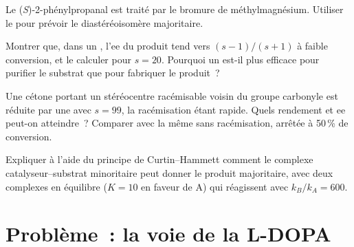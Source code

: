\begin{exercise}[$\star\star$]\label{exo:b3:asymmetric-synthesis:9}
Le (\textit{S})-2-phénylpropanal est traité par le bromure de méthylmagnésium. Utiliser le 
pour prévoir le diastéréoisomère majoritaire.
\end{exercise}

\begin{exercise}[$\star\star\star$]\label{exo:b3:asymmetric-synthesis:10}
Montrer que, dans un , l'ee du produit tend vers $(s - 1)/(s + 1)$ à faible
conversion, et le calculer pour $s = 20$. Pourquoi un  est-il plus efficace pour purifier
le substrat que pour fabriquer le produit~?
\end{exercise}

\begin{exercise}[$\star\star\star$]\label{exo:b3:asymmetric-synthesis:11}
Une cétone portant un stéréocentre racémisable voisin du groupe carbonyle
est réduite par une  avec $s = 99$, la racémisation étant rapide. Quels rendement et ee peut-on
atteindre~? Comparer avec la même  sans racémisation, arrêtée à
50\,\% de conversion.
\end{exercise}

\begin{exercise}[$\star\star\star$]\label{exo:b3:asymmetric-synthesis:12}
Expliquer à l'aide du principe de Curtin--Hammett comment le complexe
catalyseur--substrat minoritaire peut donner le produit majoritaire, avec deux
complexes en équilibre
($K = 10$ en faveur de A) qui réagissent avec $k_B/k_A = 600$.
\end{exercise}

\section{Problème~: la voie de la L-DOPA}

